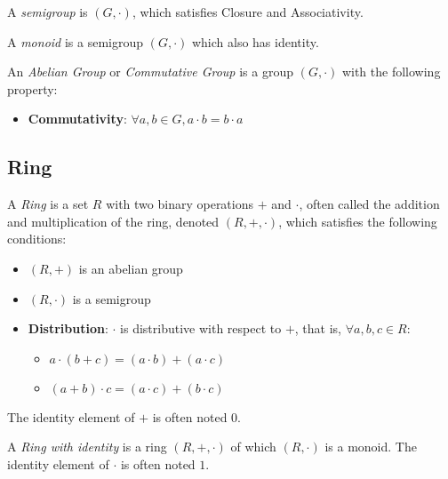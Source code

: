 \documentclass{report}
\begin{document}
		\begin{defn}[Semigroup] \label{def_semigroup}
			A \emph{semigroup} is $(G,\cdot)$, which satisfies Closure and Associativity.
		\end{defn}

		\begin{defn}[Monoid] \label{def_monoid}
			A \emph{monoid} is a semigroup $(G,\cdot)$ which also has identity.
		\end{defn}

		\begin{defn} \label{def_abelian_group}
			An \emph{Abelian Group} or \emph{Commutative Group} is a group $(G,\cdot)$ with the following property:
			\begin{itemize}
				\item \textbf{Commutativity}: $\forall a,b \in G, a \cdot b=b \cdot a$
			\end{itemize}
		\end{defn}

		\subsection{Ring}

			\begin{defn}[Ring] \label{def_ring}
				A \emph{Ring} is a set $R$ with two binary operations $+$ and $\cdot$, often called the addition and multiplication of the ring, denoted $(R,+,\cdot)$, which satisfies the following conditions:
				\begin{itemize}
					\item $(R,+)$ is an abelian group
					\item $(R,\cdot)$ is a semigroup
					\item \textbf{Distribution}: $\cdot$ is distributive with respect to $+$, that is, $\forall a,b,c \in R$:
					\begin{itemize}[label=-]
						\item $a \cdot (b + c)=(a \cdot b) + (a \cdot c)$
						\item $(a + b) \cdot c=(a \cdot c) + (b \cdot c)$
					\end{itemize}
				\end{itemize}
			The identity element of $+$ is often noted $0$.
			\end{defn}

		\begin{defn} \label{def_ring_with_1}
			A \emph{Ring with identity} is a ring $(R,+,\cdot)$ of which $(R,\cdot)$ is a monoid. The identity element of $\cdot$ is often noted $1$.
		\end{defn}
\end{document}
